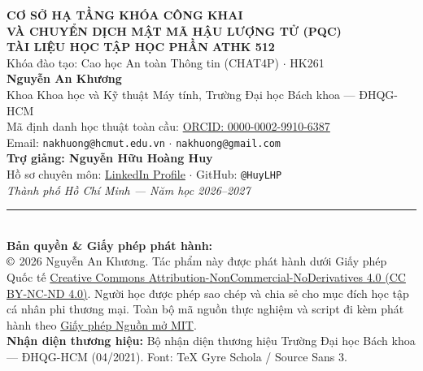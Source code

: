 \documentclass{hcmut-textbook}
\begin{document}
\thispagestyle{empty}
\vspace*{3cm}
\begin{center}
  {\Huge\sffamily\bfseries\color{HCMUTblue} CƠ SỞ HẠ TẦNG KHÓA CÔNG KHAI}\\[0.4cm]
  {\Large\sffamily\bfseries\color{HCMUTazure} VÀ CHUYỂN DỊCH MẬT MÃ HẬU LƯỢNG TỬ (PQC)}\\[1.2cm]
  {\large\sffamily\textbf{TÀI LIỆU HỌC TẬP HỌC PHẦN ATHK 512}}\\[0.3cm]
  {\normalsize\sffamily Khóa đào tạo: Cao học An toàn Thông tin (CHAT4P) $\cdot$ HK261}\\[2.0cm]

  {\large\sffamily\textbf{Nguyễn An Khương}}\\[0.2cm]
  {\small\sffamily Khoa Khoa học và Kỹ thuật Máy tính, Trường Đại học Bách khoa --- ĐHQG-HCM}\\[0.15cm]
  {\footnotesize\sffamily Mã định danh học thuật toàn cầu: \href{https://orcid.org/0000-0002-9910-6387}{ORCID: 0000-0002-9910-6387}}\\[0.15cm]
  {\footnotesize\sffamily Email: \texttt{nakhuong@hcmut.edu.vn} $\cdot$ \texttt{nakhuong@gmail.com}}\\[1.0cm]

  {\normalsize\sffamily\textbf{Trợ giảng: Nguyễn Hữu Hoàng Huy}}\\[0.15cm]
  {\footnotesize\sffamily Hồ sơ chuyên môn: \href{https://www.linkedin.com/in/nguyen-huu-hoang-huy-abb138366/}{LinkedIn Profile} $\cdot$ GitHub: \texttt{@HuyLHP}}\\[2.5cm]

  {\itshape\color{MMslate} Thành phố Hồ Chí Minh --- Năm học 2026--2027}
\end{center}
\vfill
\noindent\rule{\linewidth}{0.4pt}\\[0.2cm]
{\footnotesize\color{MMslate}
\textbf{Bản quyền \& Giấy phép phát hành:}\\
$\copyright$ 2026 Nguyễn An Khương. Tác phẩm này được phát hành dưới Giấy phép Quốc tế \href{https://creativecommons.org/licenses/by-nc-nd/4.0/}{Creative Commons Attribution-NonCommercial-NoDerivatives 4.0 (CC BY-NC-ND 4.0)}. Người học được phép sao chép và chia sẻ cho mục đích học tập cá nhân phi thương mại. Toàn bộ mã nguồn thực nghiệm và script đi kèm phát hành theo \href{https://opensource.org/licenses/MIT}{Giấy phép Nguồn mở MIT}.\\
\textbf{Nhận diện thương hiệu:} Bộ nhận diện thương hiệu Trường Đại học Bách khoa --- ĐHQG-HCM (04/2021). Font: TeX Gyre Schola / Source Sans 3.
}
\clearpage
\end{document}
